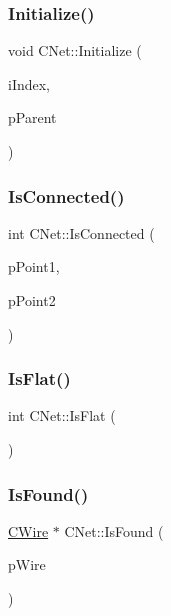 \mbox{\label{classCNet_aa9584e96f1e2aa7701ec11f40686db23}} 
\subsubsection{\texorpdfstring{Initialize()}{Initialize()}}
{\footnotesize\ttfamily void C\+Net\+::\+Initialize (\begin{DoxyParamCaption}\item[{int}]{i\+Index,  }\item[{\mbox{\hyperlink{classCDesign}{C\+Design}} $\ast$}]{p\+Parent }\end{DoxyParamCaption})\hspace{0.3cm}{\ttfamily [virtual]}}

\mbox{\label{classCNet_a911d486b626482b3893076ec39c312e6}} 
\subsubsection{\texorpdfstring{IsConnected()}{IsConnected()}}
{\footnotesize\ttfamily int C\+Net\+::\+Is\+Connected (\begin{DoxyParamCaption}\item[{\mbox{\hyperlink{classCPoint}{C\+Point}} $\ast$}]{p\+Point1,  }\item[{\mbox{\hyperlink{classCPoint}{C\+Point}} $\ast$}]{p\+Point2 }\end{DoxyParamCaption})}

\mbox{\label{classCNet_a4ceed5e43d69020526e5dd084024baa6}} 
\subsubsection{\texorpdfstring{IsFlat()}{IsFlat()}}
{\footnotesize\ttfamily int C\+Net\+::\+Is\+Flat (\begin{DoxyParamCaption}{ }\end{DoxyParamCaption})}

\mbox{\label{classCNet_a4181ad889db799bacf35c59e96890311}} 
\subsubsection{\texorpdfstring{IsFound()}{IsFound()}}
{\footnotesize\ttfamily \mbox{\hyperlink{classCWire}{C\+Wire}} $\ast$ C\+Net\+::\+Is\+Found (\begin{DoxyParamCaption}\item[{\mbox{\hyperlink{classCWire}{C\+Wire}} $\ast$}]{p\+Wire }\end{DoxyParamCaption})}

